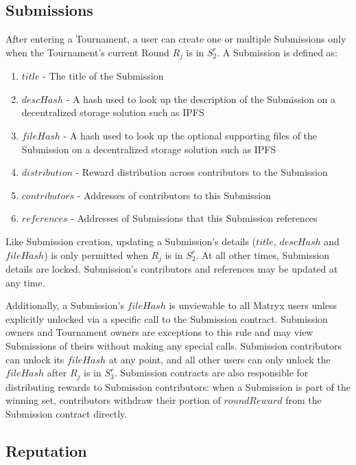 \documentclass[a4paper, 10pt, conference]{ieeeconf}      %
\begin{document}
\subsection{Submissions}\label{Submissions}

After entering a Tournament, a user can create one or multiple Submissions only when the Tournament's current Round $R_j$ is in $S_{2}^r$. A Submission is defined as:

\begin{enumerate}
\item $title$ - The title of the Submission
\item $descHash$ -  A hash used to look up the description of the Submission on a decentralized storage solution such as IPFS
\item $fileHash$ - A hash used to look up the optional supporting files of the Submission on a decentralized storage solution such as IPFS
\item $distribution$ - Reward distribution across contributors to the Submission
\item $contributors$ - Addresses of contributors to this Submission
\item $references$ - Addresses of Submissions that this Submission references
\end{enumerate}

Like Submission creation, updating a Submission's details ($title$, $descHash$ and $fileHash$) is only permitted when $R_j$ is in $S_{2}^r$. At all other times, Submission details are locked. Submission's contributors and references may be updated at any time. 

Additionally, a Submission's $fileHash$ is unviewable to all Matryx users unless explicitly unlocked via a specific call to the Submission contract. Submission owners and Tournament owners are exceptions to this rule and may view Submissions of theirs without making any special calls. Submission contributors can unlock its $fileHash$ at any point, and all other users can only unlock the $fileHash$ after $R_j$ is in $S_{3}^r$.
Submission contracts are also responsible for distributing rewards to Submission contributors: when a Submission is part of the winning set, contributors withdraw their portion of $roundReward$ from the Submission contract directly.


\subsection{Reputation}\label{reputation}
\end{document}

